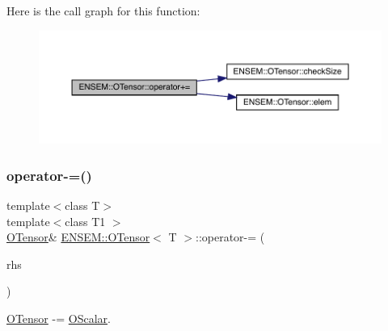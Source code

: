 Here is the call graph for this function\+:
\nopagebreak
\begin{figure}[H]
\begin{center}
\leavevmode
\includegraphics[width=350pt]{da/d8a/classENSEM_1_1OTensor_a621ebf0d6d94eb56c1e3b31cb8c933b1_cgraph}
\end{center}
\end{figure}
\mbox{\label{classENSEM_1_1OTensor_a61ebd11eac882623ea080293b007972b}} 
\subsubsection{\texorpdfstring{operator-\/=()}{operator-=()}\hspace{0.1cm}{\footnotesize\ttfamily [1/4]}}
{\footnotesize\ttfamily template$<$class T$>$ \\
template$<$class T1 $>$ \\
\mbox{\hyperlink{classENSEM_1_1OTensor}{O\+Tensor}}\& \mbox{\hyperlink{classENSEM_1_1OTensor}{E\+N\+S\+E\+M\+::\+O\+Tensor}}$<$ T $>$\+::operator-\/= (\begin{DoxyParamCaption}\item[{const \mbox{\hyperlink{classENSEM_1_1OScalar}{O\+Scalar}}$<$ T1 $>$ \&}]{rhs }\end{DoxyParamCaption})\hspace{0.3cm}{\ttfamily [inline]}}



\mbox{\hyperlink{classENSEM_1_1OTensor}{O\+Tensor}} -\/= \mbox{\hyperlink{classENSEM_1_1OScalar}{O\+Scalar}}. 

